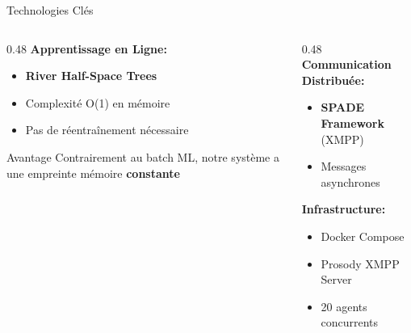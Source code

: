 \documentclass[aspectratio=169]{beamer}
\begin{document}
\begin{frame}{Technologies Clés}
    \begin{columns}[T]
        \begin{column}{0.48\textwidth}
            \textbf{Apprentissage en Ligne:}
            \begin{itemize}
                \item \textbf{River Half-Space Trees}
                \item Complexité O(1) en mémoire
            
                \item Pas de réentraînement nécessaire
            \end{itemize}
            
            \vspace{0.4cm}
            
            \begin{block}{Avantage}
                Contrairement au batch ML, notre système a une empreinte mémoire \textbf{constante}
            \end{block}
        \end{column}
        
        \begin{column}{0.48\textwidth}
            \textbf{Communication Distribuée:}
            \begin{itemize}
                \item \textbf{SPADE Framework} (XMPP)
                \item Messages asynchrones
            \end{itemize}
            
            \vspace{0.4cm}
            
            \textbf{Infrastructure:}
            \begin{itemize}
                \item Docker Compose
                \item Prosody XMPP Server
                \item 20 agents concurrents
            \end{itemize}
        \end{column}
    \end{columns}
\end{frame}


    
\end{document}
